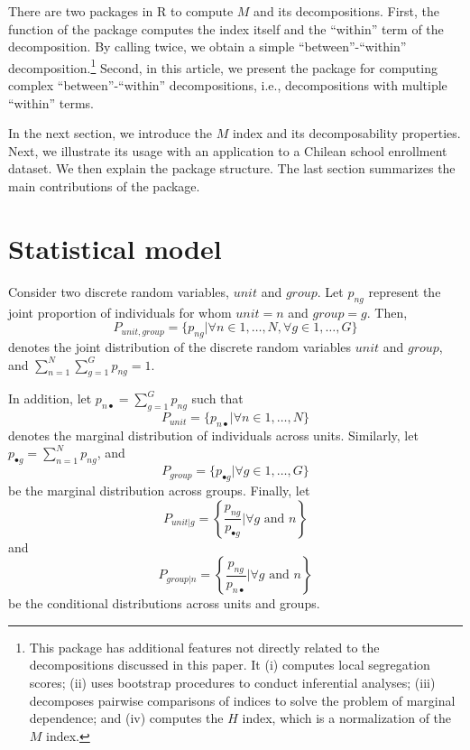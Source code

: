 There are two packages in R to compute $M$ and its decompositions. First, the  function of the  package \citep{segregation-package} computes the index itself and the ``within'' term of the decomposition. By calling  twice, we obtain a simple ``between''-``within''  decomposition.\footnote{This package has additional features not directly related to the decompositions discussed in this paper. It (i) computes local segregation scores; (ii) uses bootstrap procedures to conduct inferential analyses; (iii) decomposes pairwise comparisons of indices to solve the problem of marginal dependence; and (iv) computes the $H$ index, which is a normalization of the $M$ index.} Second, in this article, we present the  package \citep{mutualinf-package} for computing complex ``between''-``within'' decompositions, i.e., decompositions with multiple ``within'' terms.

In the next section, we introduce the $M$ index and its decomposability properties. Next, we illustrate its usage with an application to a Chilean school enrollment dataset. We then explain the package structure. The last section summarizes the main contributions of the  package.

\section{Statistical model}
Consider two discrete random variables, $unit$ and $group$. Let $p_{ng}$ represent the joint proportion of individuals for whom $unit=n$ and $group=g$. Then, 
\begin{equation}
P_{unit, group} = \{p_{ng}| \forall n \in 1,\ldots,N, \forall g \in 1,\ldots,G\} \label{eq: joint}
\end{equation}
denotes the joint distribution of the discrete random variables $unit$ and $group$, and $\sum_{n=1}^{N} \sum_{g=1}^{G} p_{ng} = 1$. 

In addition, let $p_{n \bullet} = \sum_{g=1}^{G}p_{ng}$ such that
\begin{equation}
P_{unit} = \{p_{n\bullet}| \forall n \in 1,\ldots,N\} \label{eq: marg_unit}
\end{equation}
denotes the marginal distribution of individuals across units. Similarly, let $p_{\bullet g} = \sum_{n=1}^{N} p_{ng}$, and
\begin{equation}
P_{group} = \{p_{\bullet g}| \forall g \in 1,\ldots,G\} \label{eq: marg_group}
\end{equation}
be the marginal distribution across groups. Finally, let
\begin{equation}
P_{unit|g} = \left\{\frac{p_{ng}}{ p_{\bullet g}}| \forall g \text{ and } n\right\} \label{cond_g}
\end{equation}
and
\begin{equation}
P_{group|n} = \left\{\frac{p_{ng}}{ p_{n\bullet}}| \forall g \text{ and } n\right\} \label{cond_n}
\end{equation}
be the conditional distributions across units and groups. 

